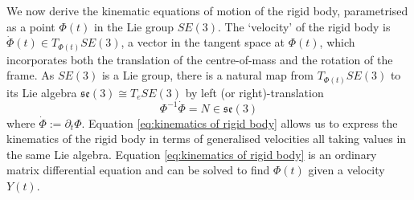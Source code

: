 We now derive the kinematic equations of motion of the rigid body, parametrised as a point $\Phi(t)$ in the Lie group $SE(3)$. The `velocity' of the rigid body is $\dot{\Phi}(t) \in T_{\Phi(t)} SE(3)$, a vector in the tangent space at $\Phi(t)$, which incorporates both the translation of the centre-of-mass and the rotation of the frame. As $SE(3)$ is a Lie group, there is a natural map from $T_{\Phi(t)} SE(3)$ to its Lie algebra $\mathfrak{se}(3) \cong T_{e} SE(3)$ by left (or right)-translation
\begin{equation} \label{eq:kinematics of rigid body}
\Phi^{-1} \dot{\Phi} = N \in \mathfrak{se}(3)
\end{equation} 
where $\dot{\Phi} := \partial_t \Phi$. Equation \ref{eq:kinematics of rigid body} allows us to express the kinematics of the rigid body in terms of generalised velocities all taking values in the same Lie algebra. Equation \ref{eq:kinematics of rigid body} is an ordinary matrix differential equation and can be solved to find $\Phi(t)$ given a velocity $Y(t)$. 

